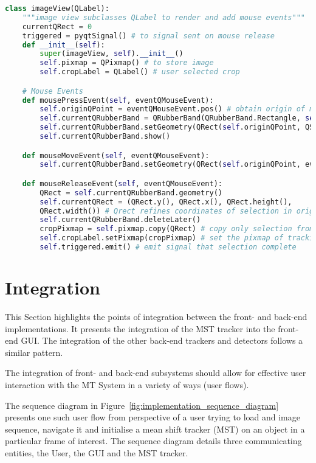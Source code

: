\begin{lstlisting}[language=Python, caption={Code for User selection of regions/objects of interest}, captionpos=b, label={lst:image_view}]
class imageView(QLabel):
    """image view subclasses QLabel to render and add mouse events"""
    currentQRect = 0
    triggered = pyqtSignal() # to signal sent on mouse release
    def __init__(self):
        super(imageView, self).__init__()
        self.pixmap = QPixmap() # to store image
        self.cropLabel = QLabel() # user selected crop

    # Mouse Events
    def mousePressEvent(self, eventQMouseEvent):
        self.originQPoint = eventQMouseEvent.pos() # obtain origin of mouse click
        self.currentQRubberBand = QRubberBand(QRubberBand.Rectangle, self) # rubberband selection
        self.currentQRubberBand.setGeometry(QRect(self.originQPoint, QSize())) # 
        self.currentQRubberBand.show()

    def mouseMoveEvent(self, eventQMouseEvent):
        self.currentQRubberBand.setGeometry(QRect(self.originQPoint, eventQMouseEvent.pos()).normalized())

    def mouseReleaseEvent(self, eventQMouseEvent):
        QRect = self.currentQRubberBand.geometry() 
        self.currentQRect = (QRect.y(), QRect.x(), QRect.height(),
        QRect.width()) # Qrect refines coordinates of selection in original image
        self.currentQRubberBand.deleteLater() 
        cropPixmap = self.pixmap.copy(QRect) # copy only selection from current frame
        self.cropLabel.setPixmap(cropPixmap) # set the pixmap of tracking view
        self.triggered.emit() # emit signal that selection complete
\end{lstlisting}

\section{Integration}
This Section highlights the points of integration between the front- and
back-end implementations. It presents the integration of the MST tracker into
the front-end GUI\@. The integration of the other back-end trackers and detectors
follows a similar pattern.

The integration of front- and back-end subsystems should allow for effective
user interaction with the MT System in a variety of ways (user flows). 

The sequence diagram in Figure~\ref{fig:implementation_sequence_diagram} presents
one such user flow from perspective of a user trying to load and image sequence,
navigate it and initialise a mean shift tracker (MST) on an object in a particular
frame of interest. The sequence diagram details three communicating entities,
the User, the GUI and the MST tracker.

